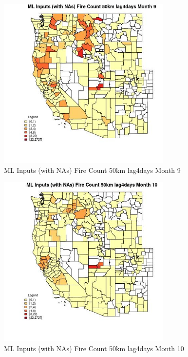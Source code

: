 \begin{figure} 
\centering  
\includegraphics[width=0.77\textwidth]{Code_Outputs/Report_ML_input_PM25_Step4_part_f_de_duplicated_aves_prioritize_24hr_obswNAs_CountyFire_Count_50km_lag4daysmedianMonth9.jpg} 
\caption{\label{fig:Report_ML_input_PM25_Step4_part_f_de_duplicated_aves_prioritize_24hr_obswNAsCountyFire_Count_50km_lag4daysmedianMonth9}ML Inputs (with NAs) Fire Count 50km lag4days Month 9} 
\end{figure} 
 

\begin{figure} 
\centering  
\includegraphics[width=0.77\textwidth]{Code_Outputs/Report_ML_input_PM25_Step4_part_f_de_duplicated_aves_prioritize_24hr_obswNAs_CountyFire_Count_50km_lag4daysmedianMonth10.jpg} 
\caption{\label{fig:Report_ML_input_PM25_Step4_part_f_de_duplicated_aves_prioritize_24hr_obswNAsCountyFire_Count_50km_lag4daysmedianMonth10}ML Inputs (with NAs) Fire Count 50km lag4days Month 10} 
\end{figure} 
 

